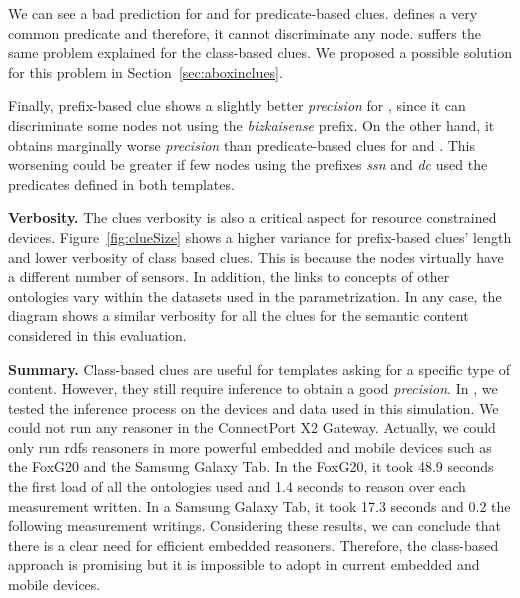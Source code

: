We can see a bad prediction for \tplone{} and \tplfour{} for predicate-based clues.
\tplone{} defines a very common predicate and therefore, it cannot discriminate any node.
\tplfour{} suffers the same problem explained for the class-based clues.
We proposed a possible solution for this problem in Section~\ref{sec:aboxinclues}.

Finally, prefix-based clue shows a slightly better \emph{precision} for \tplfour{}, since it can discriminate some nodes not using the \emph{bizkaisense} prefix.
On the other hand, it obtains marginally worse \emph{precision} than predicate-based clues for \tplthree{} and \tplfive{}.
This worsening could be greater if few nodes using the prefixes \emph{ssn} and \emph{dc} used the predicates defined in both templates.

\medskip

\noindent\textbf{Verbosity.}
The clues verbosity is also a critical aspect for resource constrained devices.
Figure~\ref{fig:clueSize} shows a higher variance for prefix-based clues' length and lower verbosity of class based clues.
This is because the nodes virtually have a different number of sensors.
In addition, the links to concepts of other ontologies vary within the datasets used in the parametrization.
In any case, the diagram shows a similar verbosity for all the clues for the semantic content considered in this evaluation. %






\medskip

\noindent\textbf{Summary.}
Class-based clues are useful for templates asking for a specific type of content.
However, they still require inference to obtain a good \emph{precision}.
In \citet{gomez-goiri_restful_2012}, we tested the inference process on the devices and data used in this simulation.
We could not run any reasoner in the ConnectPort X2 Gateway.
Actually, we could only run \acs{rdfs} reasoners in more powerful embedded and mobile devices such as the FoxG20 and the Samsung Galaxy Tab.
In the FoxG20, it took 48.9 seconds the first load of all the ontologies used and 1.4 seconds to reason over each measurement written.
In a Samsung Galaxy Tab, it took 17.3 seconds and 0.2 the following measurement writings.
Considering these results, we can conclude that there is a clear need for efficient embedded reasoners.
Therefore, the class-based approach is promising but it is impossible to adopt in current embedded and mobile devices.


